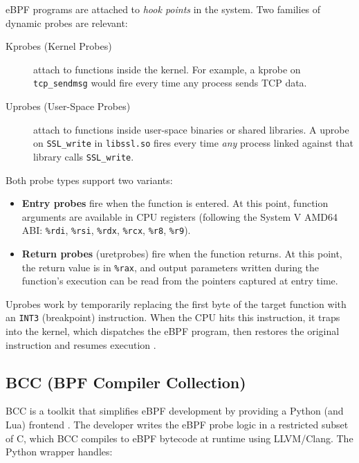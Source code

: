 \documentclass[11pt,a4paper]{article}
\begin{document}
eBPF programs are attached to \textit{hook points} in the system. Two families
of dynamic probes are relevant:

\begin{description}
    \item[Kprobes (Kernel Probes)] attach to functions inside the kernel. For
        example, a kprobe on \texttt{tcp\_sendmsg} would fire every time any
        process sends TCP data.
    \item[Uprobes (User-Space Probes)] attach to functions inside user-space
        binaries or shared libraries. A uprobe on \texttt{SSL\_write} in
        \texttt{libssl.so} fires every time \textit{any} process linked against
        that library calls \texttt{SSL\_write}.
\end{description}

Both probe types support two variants:

\begin{itemize}
    \item \textbf{Entry probes} fire when the function is entered. At this
          point, function arguments are available in CPU registers (following
          the System V AMD64 ABI: \texttt{\%rdi}, \texttt{\%rsi},
          \texttt{\%rdx}, \texttt{\%rcx}, \texttt{\%r8}, \texttt{\%r9}).
    \item \textbf{Return probes} (uretprobes) fire when the function returns.
          At this point, the return value is in \texttt{\%rax}, and
          output parameters written during the function's execution can be read
          from the pointers captured at entry time.
\end{itemize}

Uprobes work by temporarily replacing the first byte of the target function
with an \texttt{INT3} (breakpoint) instruction. When the CPU hits this
instruction, it traps into the kernel, which dispatches the eBPF program,
then restores the original instruction and resumes execution
\cite{kernel_uprobe}.

\subsection{BCC (BPF Compiler Collection)}
\label{subsec:bcc}

BCC is a toolkit that simplifies eBPF development by providing a Python (and
Lua) frontend \cite{bcc_repo}. The developer writes the eBPF probe logic in a
restricted subset of C, which BCC compiles to eBPF bytecode at runtime using
LLVM/Clang. The Python wrapper handles:
\end{document}
